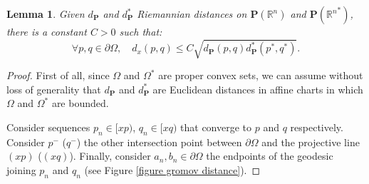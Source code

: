 \documentclass[JEP,XML,SOM,Unicode,NoEqCountersInSection,NoFloatCountersInSection,published]{cedram}
\newtheorem{lemma}[theo]{Lemma}
\theoremstyle{definition}
\newcommand{\proj}{\mathbf{P}}
\newcommand{\R}{\mathbb{R}}
\begin{document}
\begin{lemma} \label{lemma gromov smaller euclid}
Given $d_\proj$ and $d_\proj^*$ Riemannian distances on $\proj(\R^n)$ and $\proj({\R^n}^*)$, there is a constant $C>0$ such that:
\[ \forall p,q\in\partial \Omega,\quad d_x(p,q) \leq C \sqrt{d_\proj(p,q) d_\proj^*(p^*,q^*)}.\]
\end{lemma}

\begin{proof}
First of all, since $\Omega$ and $\Omega^*$ are proper convex sets, we can assume without loss of generality that $d_\proj$ and $d_\proj^*$ are Euclidean distances in affine charts in which $\Omega$ and $\Omega^*$ are bounded.

Consider sequences $p_n\in[xp)$, $q_n\in[xq)$ that converge to $p$ and $q$ respectively. Consider $p^-$ (\resp $q^-$) the other intersection point between $\partial \Omega$ and the projective line $(xp)$ (\resp $(xq)$). Finally, consider $a_n,b_n\in \partial \Omega$ the endpoints of the geodesic joining $p_n$ and $q_n$ (see Figure \ref{figure gromov distance}).


\end{proof}
\end{document}
